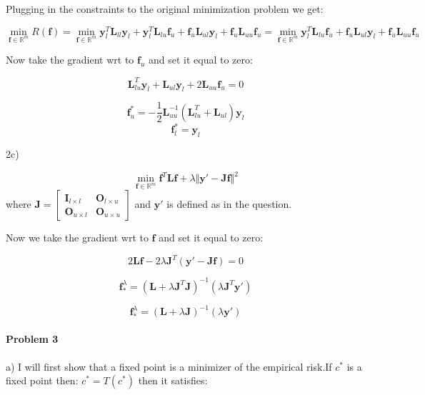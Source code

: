 \documentclass[12pt]{report}
\begin{document}
Plugging in the constraints to the original minimization problem we get:

$$ \underset{\mathbf{f} \in \mathbb{R}^m} {\min} R(\mathbf{f}) = 
\underset{\mathbf{f} \in \mathbb{R}^m} {\min} 
\mathbf{y}^T_l\mathbf{L}_{ll}\mathbf{y}_l
+
\mathbf{y}^T_l\mathbf{L}_{lu}\mathbf{f}_u
+
\mathbf{f}_u\mathbf{L}_{ul}\mathbf{y}_l
+
\mathbf{f}_u\mathbf{L}_{uu}\mathbf{f}_u
=
\underset{\mathbf{f} \in \mathbb{R}^m} {\min}
\mathbf{y}^T_l\mathbf{L}_{lu}\mathbf{f}_u
+
\mathbf{f}_u\mathbf{L}_{ul}\mathbf{y}_l
+
\mathbf{f}_u\mathbf{L}_{uu}\mathbf{f}_u
$$

Now take the gradient wrt to $\mathbf{f}_u$ and set it equal to zero:

$$
\mathbf{L}_{lu}^T\mathbf{y}_l
+
\mathbf{L}_{ul}\mathbf{y}_l
+
2\mathbf{L}_{uu}\mathbf{f}_u = 0
$$


$$
\boxed{
\mathbf{f}^*_{u} = -\frac{1}{2} \mathbf{L}_{uu}^{-1} (\mathbf{L}_{lu}^T+\mathbf{L}_{ul})\mathbf{y}_{l}
}
$$
$$
\boxed{
\mathbf{f}^*_{l} = \mathbf{y}_{l}
}
$$

2c)

\begin{equation}
 \underset{\mathbf{f} \in \mathbb{R}^m} {\min}
 \mathbf{f}^T\mathbf{L}\mathbf{f}
+ \lambda
%
\Vert \mathbf{y'} - \mathbf{J} \mathbf{f} \Vert^2
%
\end{equation}
where $ \mathbf{J} = \begin{bmatrix} \mathbf{I}_{l \times l} & \mathbf{O}_{l \times u} \\ \mathbf{O}_{u \times l} & \mathbf{O}_{u \times u} \end{bmatrix}$ and $\mathbf{y'}$ is defined as in the question.

Now we take the gradient wrt to $\mathbf{f}$ and set it equal to zero:

$$2\mathbf{L}\mathbf{f} - 2 \lambda \mathbf{J}^T(\mathbf{y'} -\mathbf{J}\mathbf{f}) = 0$$

$$\mathbf{f}_*^{\lambda} = ( \mathbf{L}+ \lambda \mathbf{J}^T \mathbf{J} )^{-1} (\lambda \mathbf{J}^T\mathbf{y'})$$

$$
\boxed{
\mathbf{f}_*^{\lambda} = ( \mathbf{L}+ \lambda \mathbf{J} )^{-1} (\lambda \mathbf{y'})
}
$$

\paragraph{Problem 3}
a)
I will first show that a fixed point is a minimizer of the empirical risk.If $c^*$ is a fixed point then: $ c^* = T(c^*) $ then it satisfies:
\end{document}
